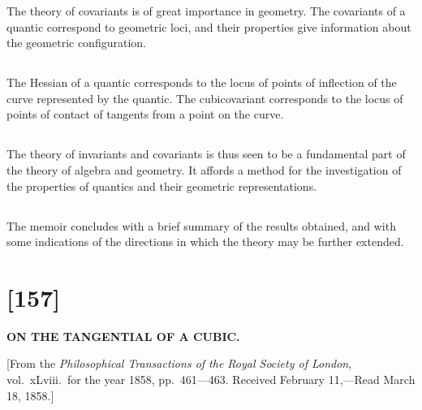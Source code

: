 \documentclass[11pt,a4paper]{book}
\begin{document}
\begin{center}
The theory of covariants is of great importance in geometry. The covariants of a quantic correspond to geometric loci, and their properties give information about the geometric configuration.

\subsection{}

The Hessian of a quantic corresponds to the locus of points of inflection of the curve represented by the quantic. The cubicovariant corresponds to the locus of points of contact of tangents from a point on the curve.

\subsection{}

The theory of invariants and covariants is thus seen to be a fundamental part of the theory of algebra and geometry. It affords a method for the investigation of the properties of quantics and their geometric representations.

\subsection{}

The memoir concludes with a brief summary of the results obtained, and with some indications of the directions in which the theory may be further extended.



\newpage
\section*{[157]}

\begin{center}
\Large\textbf{ON THE TANGENTIAL OF A CUBIC.}
\end{center}

\begin{center}
\small[From the \textit{Philosophical Transactions of the Royal Society of London}, vol.~xLviii.\ for the year 1858, pp.~461---463. Received February 11,---Read March 18, 1858.]
\end{center}


\end{center}
\end{document}
